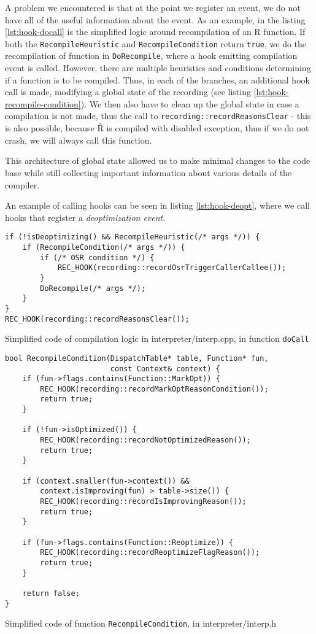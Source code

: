 A problem we encountered is that at the point we register an event, we do not have all of the useful information about the event. As an example, in the listing \ref{lst:hook-docall} is the simplified logic around recompilation of an R function. If both the \texttt{RecompileHeuristic} and \texttt{RecompileCondition} return \texttt{true}, we do the recompilation of function in \texttt{DoRecompile}, where a hook emitting compilation event is called. However, there are multiple heuristics and conditions determining if a function is to be compiled. Thus, in each of the branches, an additional hook call is made, modifying a global state of the recording (see listing \ref{lst:hook-recompile-condition}). We then also have to clean up the global state in case a compilation is not made, thus the call to \texttt{recording::recordReasonsClear} - this is also possible, because Ř is compiled with disabled exception, thus if we do not crash, we will always call this function.

This architecture of global state allowed us to make minimal changes to the code base while still collecting important information about various details of the compiler.

An example of calling hooks can be seen in listing \ref{lst:hook-deopt}, where we call hooks that register a \textit{deoptimization event}.

\begin{listing}
	\begin{verbatim}
if (!isDeoptimizing() && RecompileHeuristic(/* args */)) {
    if (RecompileCondition(/* args */)) {
        if (/* OSR condition */) {
            REC_HOOK(recording::recordOsrTriggerCallerCallee());
        }
        DoRecompile(/* args */);
    }
}
REC_HOOK(recording::recordReasonsClear());
  \end{verbatim}
	\caption{Simplified code of compilation logic in interpreter/interp.cpp, in function \texttt{doCall}}\label{lst:hook-docall}
\end{listing}

\begin{listing}
	\begin{verbatim}
bool RecompileCondition(DispatchTable* table, Function* fun,
                        const Context& context) {
    if (fun->flags.contains(Function::MarkOpt)) {
        REC_HOOK(recording::recordMarkOptReasonCondition());
        return true;
    }

    if (!fun->isOptimized()) {
        REC_HOOK(recording::recordNotOptimizedReason());
        return true;
    }

    if (context.smaller(fun->context()) &&
        context.isImproving(fun) > table->size()) {
        REC_HOOK(recording::recordIsImprovingReason());
        return true;
    }

    if (fun->flags.contains(Function::Reoptimize)) {
        REC_HOOK(recording::recordReoptimizeFlagReason());
        return true;
    }

    return false;
}
\end{verbatim}
	\caption{Simplified code of function \texttt{RecompileCondition}, in interpreter/interp.h}\label{lst:hook-recompile-condition}
\end{listing}



